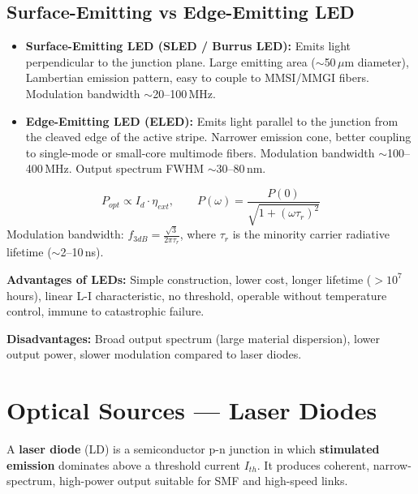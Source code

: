 \documentclass[12pt,a4paper]{article}
\begin{document}
\subsection{Surface-Emitting vs Edge-Emitting LED}
\begin{itemize}[leftmargin=*, itemsep=3pt]
  \item \textbf{Surface-Emitting LED (SLED / Burrus LED):} Emits light perpendicular to the junction plane. Large emitting area ($\sim$50\,$\mu$m diameter), Lambertian emission pattern, easy to couple to MMSI/MMGI fibers. Modulation bandwidth $\sim$20--100\,MHz.
  \item \textbf{Edge-Emitting LED (ELED):} Emits light parallel to the junction from the cleaved edge of the active stripe. Narrower emission cone, better coupling to single-mode or small-core multimode fibers. Modulation bandwidth $\sim$100--400\,MHz. Output spectrum FWHM $\sim$30--80\,nm.
\end{itemize}

\begin{tcolorbox}[formulabox, title={\textbf{LED Output and Modulation Bandwidth}}]
\[
P_{opt} \propto I_d \cdot \eta_{ext}, \qquad P(\omega) = \frac{P(0)}{\sqrt{1 + (\omega\tau_r)^2}}
\]
Modulation bandwidth: $f_{3dB} = \frac{\sqrt{3}}{2\pi\tau_r}$, where $\tau_r$ is the minority carrier radiative lifetime ($\sim$2--10\,ns).
\end{tcolorbox}

\textbf{Advantages of LEDs:} Simple construction, lower cost, longer lifetime ($>10^7$ hours), linear L-I characteristic, no threshold, operable without temperature control, immune to catastrophic failure.

\textbf{Disadvantages:} Broad output spectrum (large material dispersion), lower output power, slower modulation compared to laser diodes.

\section{Optical Sources --- Laser Diodes}

\begin{tcolorbox}[defbox, title={\textbf{Laser Diode}}]
A \textbf{laser diode} (LD) is a semiconductor p-n junction in which \textbf{stimulated emission} dominates above a threshold current $I_{th}$. It produces coherent, narrow-spectrum, high-power output suitable for SMF and high-speed links.
\end{tcolorbox}
\end{document}
